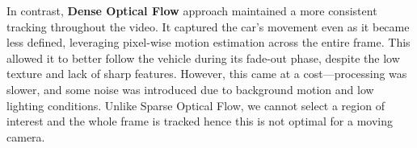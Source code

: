\documentclass[12pt,a4paper]{article}
\begin{document}
In contrast, \textbf{Dense Optical Flow} approach maintained a more consistent tracking throughout the video. It captured the car's movement 
even as it became less defined, leveraging pixel-wise motion estimation across the entire frame. This allowed it to better follow the vehicle 
during its fade-out phase, despite the low texture and lack of sharp features. However, this came at a cost—processing was slower, 
and some noise was introduced due to background motion and low lighting conditions. Unlike Sparse Optical Flow, we cannot select a region of interest and 
the whole frame is tracked hence this is not optimal for a moving camera.
\end{document}
